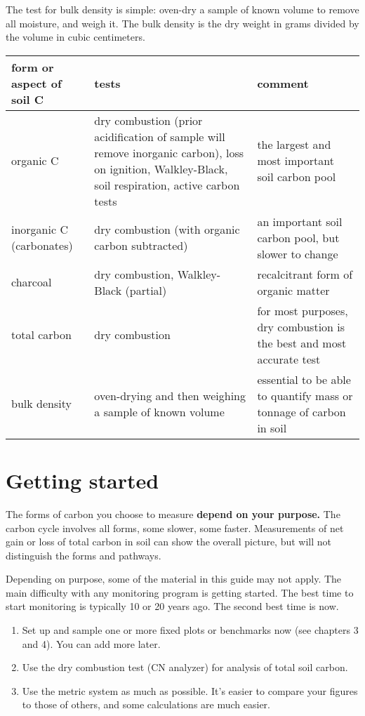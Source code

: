 \documentclass[11pt,letterpaper,oneside,onecolumn]{memoir}
\begin{document}
The test for bulk density is simple: oven-dry a sample of known volume to remove all moisture, and weigh it. The bulk density is the dry weight in grams divided by the volume in cubic centimeters.

\vspace{2em}
\footnotesize
\begin{center}
\begin{tabular}{|p{1.8in}|p{1.8in}|p{1.8in}|}\hline
\textbf{form or aspect of soil C}&\textbf{tests}&\textbf{comment}\\\hline
organic C&dry combustion (prior acidification of sample will remove inorganic carbon), loss on ignition, Walkley-Black, soil respiration, active carbon tests&the largest and most important soil carbon pool\\\hline
inorganic C (carbonates)&dry combustion (with organic carbon subtracted)&an important soil carbon pool, but slower to change\\\hline
charcoal&dry combustion, Walkley-Black (partial)&recalcitrant form of organic matter\\ \hline
total carbon&dry combustion&for most purposes, dry combustion is the best and most accurate test\\ \hline
bulk density&oven-drying and then weighing a sample of known volume&essential to be able to quantify mass or tonnage of carbon in soil\\ \hline
\end{tabular}

\end{center}
\normalsize



\section{Getting started}

\noindent The forms of carbon you choose to measure \textbf{depend on your purpose.} The carbon cycle involves all forms, some slower, some faster. Measurements of net gain or loss of total carbon in soil can show the overall picture, but will not distinguish the forms and pathways.

Depending on purpose, some of the material in this guide may not apply. The main difficulty with any monitoring program is getting started. The best time to start monitoring is typically 10 or 20 years ago. The second best time is now.

\begin{enumerate}
\item Set up and sample one or more fixed plots or benchmarks now (see chapters 3 and 4). You can add more later.

\item Use the dry combustion test (CN analyzer) for analysis of total soil carbon.

\item Use the metric system as much as possible. It's easier to compare your figures to those of others, and some calculations are much easier.
\end{enumerate}
\end{document}
